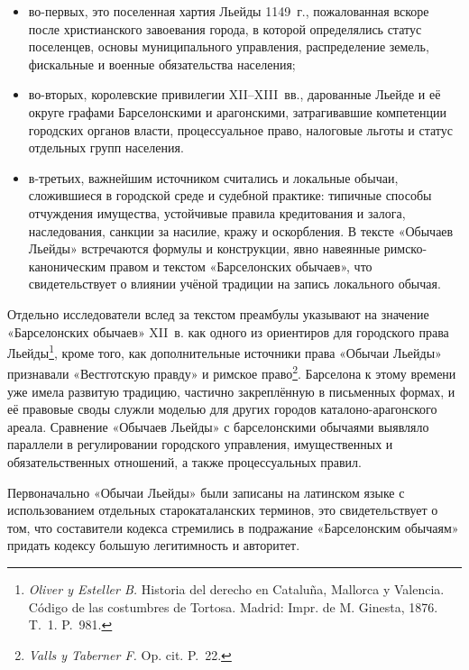 \begin{itemize}
\item во-первых, это поселенная хартия Льейды 1149~г., пожалованная вскоре после христианского завоевания города, в которой определялись статус поселенцев, основы муниципального управления, распределение земель, фискальные и военные обязательства населения;
\item во-вторых, королевские привилегии XII--XIII~вв., дарованные Льейде и её округе графами Барселонскими и арагонскими, затрагивавшие компетенции городских органов власти, процессуальное право, налоговые льготы и статус отдельных групп населения.
\item в-третьих, важнейшим источником считались и локальные обычаи, сложившиеся в городской среде и судебной практике: типичные способы отчуждения имущества, устойчивые правила кредитования и залога, наследования, санкции за насилие, кражу и оскорбления. В тексте «Обычаев Льейды» встречаются формулы и конструкции, явно навеянные римско-каноническим правом и текстом «Барселонских обычаев», что свидетельствует о влиянии учёной традиции на запись локального обычая.
\end{itemize}
Отдельно исследователи вслед за текстом преамбулы указывают на значение «Барселонских обычаев» XII~в. как одного из ориентиров для городского права Льейды\footnote{\emph{Oliver y Esteller B.} Historia del derecho en Cataluña, Mallorca y Valencia. Código de las costumbres de Tortosa. Madrid: Impr. de M. Ginesta, 1876. T.~1. P.~981.}, кроме того, как дополнительные источники права «Обычаи Льейды» признавали «Вестготскую правду» и римское право\footnote{\emph{Valls y Taberner F.} Op. cit. P.~22.}. Барселона к этому времени уже имела развитую традицию, частично закреплённую в письменных формах, и её правовые своды служли моделью для других городов каталоно-арагонского ареала. Сравнение «Обычаев Льейды» с барселонскими обычаями выявляло параллели в регулировании городского управления, имущественных и обязательственных отношений, а также процессуальных правил.

Первоначально «Обычаи Льейды» были записаны на латинском языке с использованием отдельных старокаталанских терминов, это свидетельствует о том, что составители кодекса стремились в подражание «Барселонским обычаям» придать кодексу большую легитимность и авторитет.

